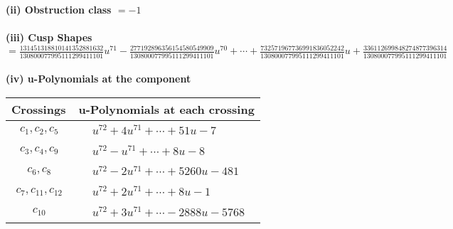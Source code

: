 \documentclass[1p]{elsarticle_modified}
\theoremstyle{definition}
\begin{document}
\flushleft \textbf{(ii) Obstruction class $= -1$}\\~\\
\flushleft \textbf{(iii) Cusp Shapes $= \frac{131451318810141352881632}{130800077995111299411101} u^{71}-\frac{277192896356154580549909}{130800077995111299411101} u^{70}+\cdots+\frac{732571967736991836052242}{130800077995111299411101} u+\frac{336112699848274877396314}{130800077995111299411101}$}\\~\\
\newpage\renewcommand{\arraystretch}{1}
\flushleft \textbf{(iv) u-Polynomials at the component}\newline \\
\begin{tabular}{m{50pt}|m{274pt}}
Crossings & \hspace{64pt}u-Polynomials at each crossing \\
\hline $$\begin{aligned}c_{1},c_{2},c_{5}\end{aligned}$$&$\begin{aligned}
&u^{72}+4 u^{71}+\cdots+51 u-7
\end{aligned}$\\
\hline $$\begin{aligned}c_{3},c_{4},c_{9}\end{aligned}$$&$\begin{aligned}
&u^{72}- u^{71}+\cdots+8 u-8
\end{aligned}$\\
\hline $$\begin{aligned}c_{6},c_{8}\end{aligned}$$&$\begin{aligned}
&u^{72}-2 u^{71}+\cdots+5260 u-481
\end{aligned}$\\
\hline $$\begin{aligned}c_{7},c_{11},c_{12}\end{aligned}$$&$\begin{aligned}
&u^{72}+2 u^{71}+\cdots+8 u-1
\end{aligned}$\\
\hline $$\begin{aligned}c_{10}\end{aligned}$$&$\begin{aligned}
&u^{72}+3 u^{71}+\cdots-2888 u-5768
\end{aligned}$\\
\hline
\end{tabular}\\~\\
\end{document}
